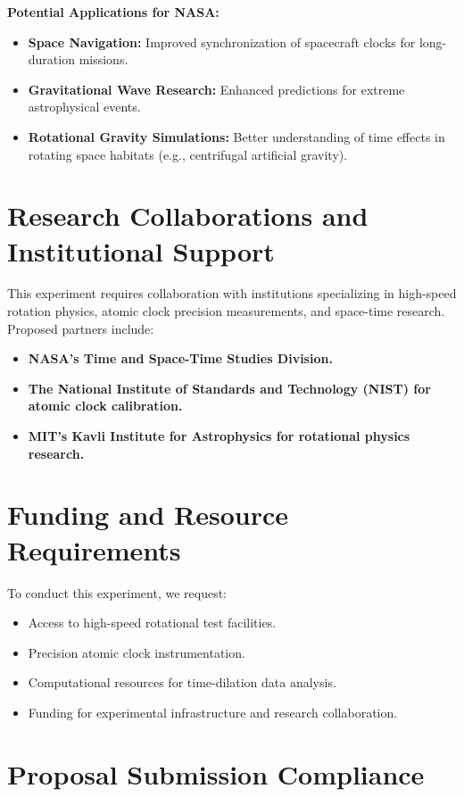 \documentclass[12pt]{article}
\begin{document}
\textbf{Potential Applications for NASA:}
\begin{itemize}
    \item \textbf{Space Navigation:} Improved synchronization of spacecraft clocks for long-duration missions.
    \item \textbf{Gravitational Wave Research:} Enhanced predictions for extreme astrophysical events.
    \item \textbf{Rotational Gravity Simulations:} Better understanding of time effects in rotating space habitats (e.g., centrifugal artificial gravity).
\end{itemize}

\section{Research Collaborations and Institutional Support}

This experiment requires collaboration with institutions specializing in high-speed rotation physics, atomic clock precision measurements, and space-time research. Proposed partners include:

\begin{itemize}
    \item \textbf{NASA's Time and Space-Time Studies Division.}
    \item \textbf{The National Institute of Standards and Technology (NIST) for atomic clock calibration.}
    \item \textbf{MIT’s Kavli Institute for Astrophysics for rotational physics research.}
\end{itemize}

\section{Funding and Resource Requirements}

To conduct this experiment, we request:

\begin{itemize}
    \item Access to high-speed rotational test facilities.
    \item Precision atomic clock instrumentation.
    \item Computational resources for time-dilation data analysis.
    \item Funding for experimental infrastructure and research collaboration.
\end{itemize}

\section{Proposal Submission Compliance}
\end{document}
